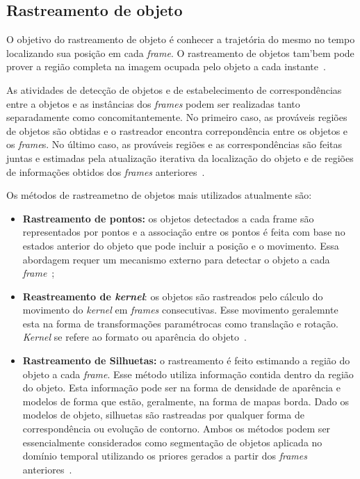 \subsection{Rastreamento de objeto}

	O objetivo do rastreamento de objeto é conhecer a trajetória do mesmo no tempo localizando sua posição em cada \textit{frame}. O rastreamento de objetos tam'bem pode prover a região completa na imagem ocupada pelo objeto a cada instante~\cite{yilmaz}. 

	As atividades de detecção de objetos e de estabelecimento de correspondências entre a objetos e as instâncias dos \textit{frames} podem ser realizadas tanto separadamente como concomitantemente. No primeiro caso, as prováveis regiões de objetos são obtidas e o rastreador encontra correpondência entre os objetos e os \textit{frame}s. No último caso, as prováveis regiões e as correspondências são feitas juntas e estimadas pela atualização iterativa da localização do objeto e de regiões de informações obtidos dos \textit{frames} anteriores~\cite{yilmaz}.

	Os métodos de rastreametno de objetos mais utilizados atualmente são:

	\begin{itemize}
		\item \textbf{Rastreamento de pontos:} os objetos detectados a cada frame são representados por pontos e a associação entre os pontos é feita com base no estados anterior do objeto que pode incluir a posição e o movimento. Essa abordagem requer um mecanismo externo para detectar o objeto a cada \textit{frame}~\cite{yilmaz};

		\item \textbf{Reastreamento de \textit{kernel}}: os objetos são rastreados pelo cálculo do movimento do \textit{kernel} em \textit{frames} consecutivas. Esse movimento geralemnte esta na forma de transformações paramétrocas como translação e rotação. \textit{Kernel} se refere ao formato ou aparência do objeto~\cite{yilmaz}.

		\item \textbf{Rastreamento de Silhuetas:} o rastreamento é feito estimando a região do objeto a cada \textit{frame}. Esse método utiliza informação contida dentro da região do objeto. Esta informação pode ser na forma de densidade de aparência e modelos de forma que estão, geralmente, na forma de mapas borda. Dado os modelos de objeto, silhuetas são rastreadas por qualquer forma de correspondência ou evolução de contorno. Ambos os métodos podem ser essencialmente considerados como segmentação de objetos aplicada no domínio temporal utilizando os priores gerados a partir dos \textit{frames} anteriores~\cite{yilmaz}.
	\end{itemize}




